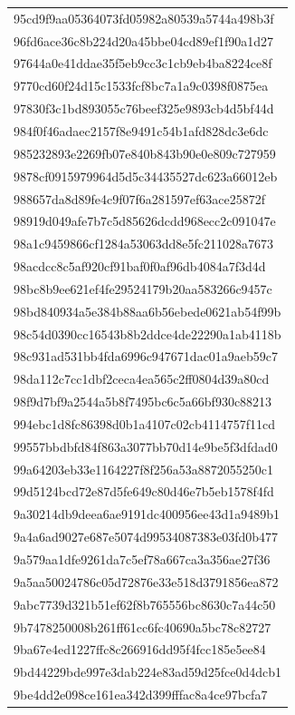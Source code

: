 \begin{tabular}{l}
95cd9f9aa05364073fd05982a80539a5744a498b3f \\
96fd6ace36c8b224d20a45bbe04cd89ef1f90a1d27 \\
97644a0e41ddae35f5eb9cc3c1cb9eb4ba8224ce8f \\
9770cd60f24d15c1533fcf8bc7a1a9c0398f0875ea \\
97830f3c1bd893055c76beef325e9893cb4d5bf44d \\
984f0f46adaec2157f8e9491c54b1afd828dc3e6dc \\
985232893e2269fb07e840b843b90e0e809c727959 \\
9878cf0915979964d5d5c34435527dc623a66012eb \\
988657da8d89fe4c9f07f6a281597ef63ace25872f \\
98919d049afe7b7c5d85626dcdd968ecc2c091047e \\
98a1c9459866cf1284a53063dd8e5fc211028a7673 \\
98acdcc8c5af920cf91baf0f0af96db4084a7f3d4d \\
98bc8b9ee621ef4fe29524179b20aa583266c9457c \\
98bd840934a5e384b88aa6b56ebede0621ab54f99b \\
98c54d0390cc16543b8b2ddce4de22290a1ab4118b \\
98c931ad531bb4fda6996c947671dac01a9aeb59c7 \\
98da112c7cc1dbf2ceca4ea565c2ff0804d39a80cd \\
98f9d7bf9a2544a5b8f7495bc6c5a66bf930c88213 \\
994ebc1d8fc86398d0b1a4107c02cb4114757f11cd \\
99557bbdbfd84f863a3077bb70d14e9be5f3dfdad0 \\
99a64203eb33e1164227f8f256a53a8872055250c1 \\
99d5124bcd72e87d5fe649c80d46e7b5eb1578f4fd \\
9a30214db9deea6ae9191dc400956ee43d1a9489b1 \\
9a4a6ad9027e687e5074d99534087383e03fd0b477 \\
9a579aa1dfe9261da7c5ef78a667ca3a356ae27f36 \\
9a5aa50024786c05d72876e33e518d3791856ea872 \\
9abc7739d321b51ef62f8b765556bc8630c7a44c50 \\
9b7478250008b261ff61cc6fc40690a5bc78c82727 \\
9ba67e4ed1227ffc8c266916dd95f4fcc185e5ee84 \\
9bd44229bde997e3dab224e83ad59d25fce0d4dcb1 \\
9be4dd2e098ce161ea342d399fffac8a4ce97bcfa7 \\

\end{tabular}
